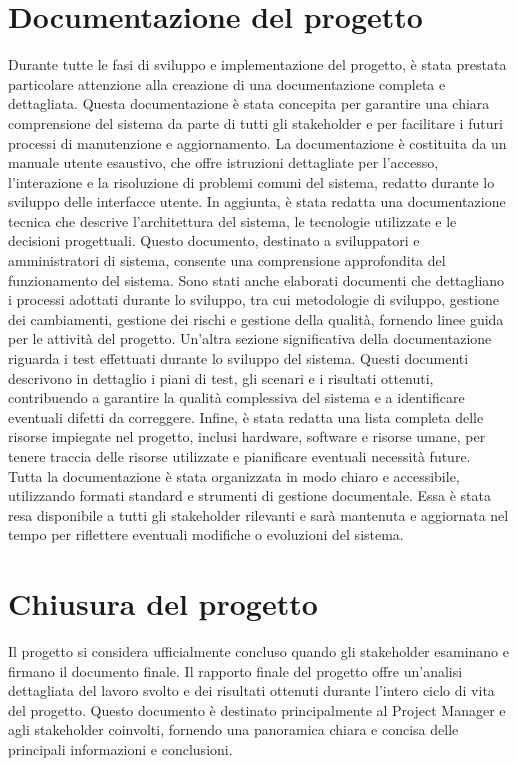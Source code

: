 \documentclass[a4paper,12pt, openright]{report}
\begin{document}
\section{Documentazione del progetto}
Durante tutte le fasi di sviluppo e implementazione del progetto, è stata prestata particolare attenzione alla creazione di una documentazione completa e dettagliata. Questa documentazione è stata concepita per garantire una chiara comprensione del sistema da parte di tutti gli stakeholder e per facilitare i futuri processi di manutenzione e aggiornamento.
La documentazione è costituita da un manuale utente esaustivo, che offre istruzioni dettagliate per l'accesso, l'interazione e la risoluzione di problemi comuni del sistema, redatto durante lo sviluppo delle interfacce utente.
In aggiunta, è stata redatta una documentazione tecnica che descrive l'architettura del sistema, le tecnologie utilizzate e le decisioni progettuali. Questo documento, destinato a sviluppatori e amministratori di sistema, consente una comprensione approfondita del funzionamento del sistema.
Sono stati anche elaborati documenti che dettagliano i processi adottati durante lo sviluppo, tra cui metodologie di sviluppo, gestione dei cambiamenti, gestione dei rischi e gestione della qualità, fornendo linee guida per le attività del progetto.
Un'altra sezione significativa della documentazione riguarda i test effettuati durante lo sviluppo del sistema. Questi documenti descrivono in dettaglio i piani di test, gli scenari e i risultati ottenuti, contribuendo a garantire la qualità complessiva del sistema e a identificare eventuali difetti da correggere.
Infine, è stata redatta una lista completa delle risorse impiegate nel progetto, inclusi hardware, software e risorse umane, per tenere traccia delle risorse utilizzate e pianificare eventuali necessità future.\\
Tutta la documentazione è stata organizzata in modo chiaro e accessibile, utilizzando formati standard e strumenti di gestione documentale. Essa è stata resa disponibile a tutti gli stakeholder rilevanti e sarà mantenuta e aggiornata nel tempo per riflettere eventuali modifiche o evoluzioni del sistema.

\section{Chiusura del progetto}

Il progetto si considera ufficialmente concluso quando gli stakeholder esaminano e firmano il documento finale. Il rapporto finale del progetto offre un'analisi dettagliata del lavoro svolto e dei risultati ottenuti durante l'intero ciclo di vita del progetto. Questo documento è destinato principalmente al Project Manager e agli stakeholder coinvolti, fornendo una panoramica chiara e concisa delle principali informazioni e conclusioni.
\end{document}
